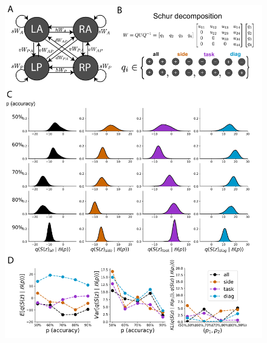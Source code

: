 \documentclass[11pt]{article}
\begin{document}
\begin{figure}
\begin{center}
\includegraphics[scale=0.5]{models/SC/SC_Fig/SC_Fig.pdf}
\end{center}
\caption{\protect}
\end{figure}
\end{document}
